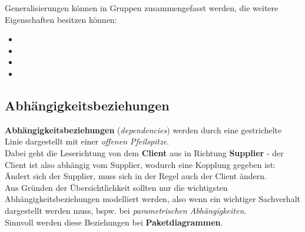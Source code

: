 \noindent
Generalisierungen können in Gruppen zusammengefasst werden, die weitere Eigenschaften besitzen können:

\begin{itemize}
    \item {}
    \item {}
    \item {}
    \item {}
\end{itemize}

\subsection*{Abhängigkeitsbeziehungen}
\textbf{Abhängigkeitsbeziehungen} (\textit{dependencies}) werden durch eine gestrichelte Linie dargestellt mit einer \textit{offenen Pfeilspitze}.\\
Dabei geht die Leserichtung von dem \textbf{Client} aus in Richtung \textbf{Supplier} - der Client ist also abhängig vom Supplier, wodurch eine Kopplung gegeben ist: Ändert sich der Supplier, muss sich in der Regel auch der Client ändern.\\

\noindent
Aus Gründen der Übersichtlichkeit sollten nur die wichtigsten Abhängigkeitsbeziehungen modelliert werden, also wenn ein wichtiger Sachverhalt dargestellt werden muss, bspw. bei \textit{parametrischen Abhängigkeiten}.\\
Sinnvoll werden diese Beziehungen bei \textbf{Paketdiagrammen}.